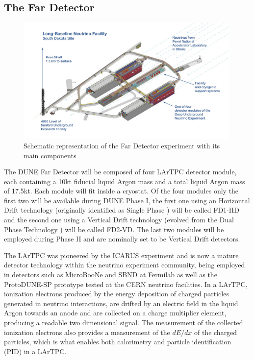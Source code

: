 \subsection{The Far Detector}
\begin{figure}[!ht]
     \centering
     \includegraphics[width=0.99\textwidth]{figures/ch3-DUNE/Far_Detector.jpg}
     \caption{Schematic representation of the Far Detector experiment with its main components}
        \label{fig:DUNEdiagram}
\end{figure}
The DUNE Far Detector will be composed of four LArTPC detector module, each containing a 10kt fiducial liquid Argon mass  and a total liquid Argon mass of 17.5kt. Each module will fit inside a cryostat. Of the four modules only the first two will be available during DUNE Phase I, the first one using an Horizontal Drift technology (originally identified as Single Phase \cite{DUNE:2020TDR4}) will be called FD1-HD and the second one using a Vertical Drift technology\cite{DUNE:2023TDRVD} (evolved from the Dual Phase Technology \cite{DUNE:2018mlo}) will be called FD2-VD. The last two modules will be employed during Phase II and are nominally set to be Vertical Drift detectors\cite{DUNE:2022Snowmass}.

The LArTPC was pioneered by the ICARUS experiment \cite{Rubbia:1977zz,ICARUS:2004wqc} and is now a mature detector technology within the neutrino experiment community, being employed in detectors such as MicroBooNe\cite{MicroBooNE:2016pwy} and SBND\cite{Machado:2019oxb} at Fermilab as well as the ProtoDUNE-SP\cite{DUNE:2020cqd} prototype tested at the CERN neutrino facilities. In a LArTPC, ionization electrons produced by the energy deposition of charged particles generated in neutrino interactions, are drifted by an electric field in the liquid Argon towards an anode and are collected on a charge multiplier element, producing a readable two dimensional signal. The measurement of the collected ionization electrons also provides a measurement of the $dE/dx$ of the charged particles, which is what enables both calorimetry and particle identification (PID) in a LArTPC.


